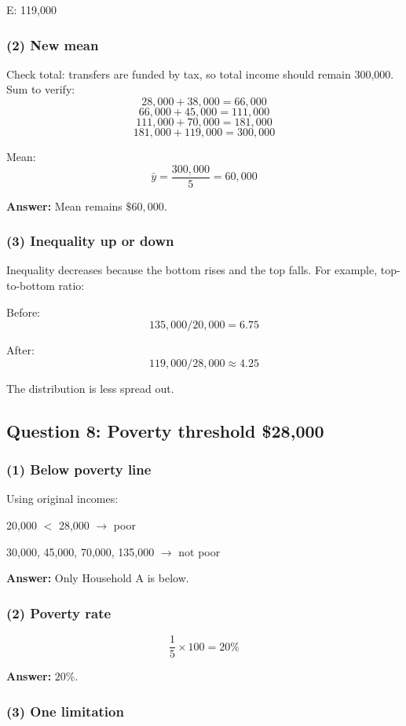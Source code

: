 \documentclass[11pt]{article}
\begin{document}
E: 119,000

\subsubsection*{(2) New mean}

Check total: transfers are funded by tax, so total income should remain 300,000. Sum to verify:
\[
28{,}000+38{,}000=66{,}000
\]
\[
66{,}000+45{,}000=111{,}000
\]
\[
111{,}000+70{,}000=181{,}000
\]
\[
181{,}000+119{,}000=300{,}000
\]

Mean:
\[
\bar{y}=\frac{300{,}000}{5}=60{,}000
\]

\textbf{Answer:} Mean remains \(\$60{,}000\).

\subsubsection*{(3) Inequality up or down}

Inequality decreases because the bottom rises and the top falls. For example, top-to-bottom ratio:

Before:
\[
135{,}000/20{,}000=6.75
\]

After:
\[
119{,}000/28{,}000\approx 4.25
\]

The distribution is less spread out.

\subsection*{Question 8: Poverty threshold \$28,000}

\subsubsection*{(1) Below poverty line}

Using original incomes:

20,000 $<$ 28,000 \(\rightarrow\) poor

30,000, 45,000, 70,000, 135,000 \(\rightarrow\) not poor

\textbf{Answer:} Only Household A is below.

\subsubsection*{(2) Poverty rate}

\[
\frac{1}{5}\times 100=20\%
\]

\textbf{Answer:} \(20\%\).

\subsubsection*{(3) One limitation}
\end{document}
